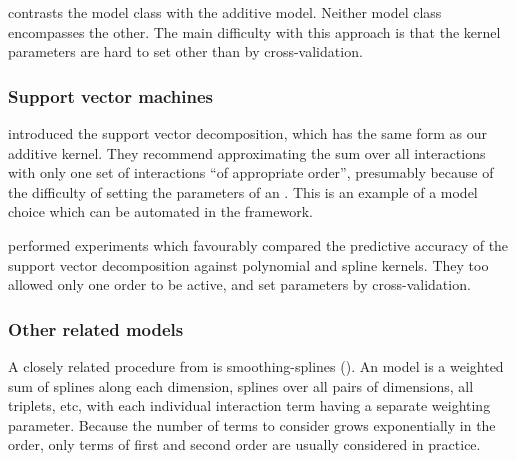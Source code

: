  contrasts the \HKL{} model class with the additive \gp{} model.
Neither model class encompasses the other.
The main difficulty with this approach is that the kernel parameters are hard to set other than by cross-validation.



\subsubsection{Support vector machines}

\citet{vapnik1998statistical} introduced the support vector \ANOVA{} decomposition, which has the same form as our additive kernel.
They recommend approximating the sum over all interactions with only one set of interactions ``of appropriate order'', presumably because of the difficulty of setting the parameters of an \SVM{}.
This is an example of a model choice which can be automated in the \gp{} framework.

\citet{stitson1999support} performed experiments which favourably compared the predictive accuracy of the support vector \ANOVA{} decomposition against polynomial and spline kernels.
They too allowed only one order to be active, and set parameters by cross-validation.
%

\subsubsection{Other related models}

A closely related procedure from \citet{wahba1990spline} is smoothing-splines \ANOVA{} (\SSANOVA{}).
An \SSANOVA{} model is a weighted sum of splines along each dimension, splines over all pairs of dimensions, all triplets, etc, with each individual interaction term having a separate weighting parameter.
Because the number of terms to consider grows exponentially in the order, only terms of first and second order are usually considered in practice.


